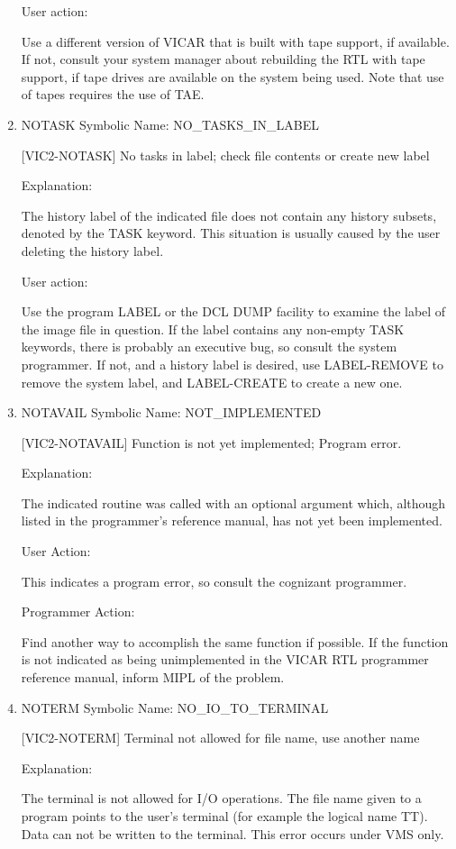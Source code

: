 \begin{enumerate}
User action:

Use a different version of VICAR that is built with tape support,
if available.  If not, consult your system manager about rebuilding
the RTL with tape support, if tape drives are available on the
system being used.  Note that use of tapes requires the use of TAE.


\item NOTASK Symbolic Name: NO\_TASKS\_IN\_LABEL

[VIC2-NOTASK] No tasks in label; check file contents or create new label

Explanation:

The history label of the indicated file does not contain any
history subsets, denoted by the TASK keyword.  This situation
is usually caused by the user deleting the history label.

User action:

Use the program LABEL or the DCL DUMP facility to examine the
label of the image file in question.  If the label contains
any non-empty TASK keywords, there is probably an executive
bug, so consult the system programmer.  If not, and a history
label is desired, use LABEL-REMOVE to remove the system
label, and LABEL-CREATE to create a new one.


\item NOTAVAIL Symbolic Name: NOT\_IMPLEMENTED

[VIC2-NOTAVAIL] Function is not yet implemented;  Program error.

Explanation:

The indicated routine was called with an optional argument which,
although listed in the programmer's reference manual, has not
yet been implemented.

User Action:

This indicates a program error, so consult the cognizant programmer.

Programmer Action:

Find another way to accomplish the same function if possible.
If the function is not indicated as being unimplemented in the
VICAR RTL programmer reference manual, inform MIPL of the problem.


\item NOTERM Symbolic Name: NO\_IO\_TO\_TERMINAL

[VIC2-NOTERM] Terminal not allowed for file name, use another name

Explanation:

The terminal is not allowed for I/O operations.  The file name
given to a program points to the user's terminal (for example
the logical name TT).  Data can not be written to the terminal.
This error occurs under VMS only.


\end{enumerate}
